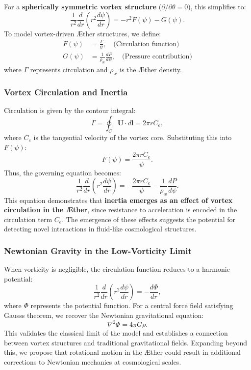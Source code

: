 For a \textbf{spherically symmetric vortex structure} ($\partial/\partial\theta = 0$), this simplifies to:
\begin{equation*}
    \frac{1}{r^2} \frac{d}{dr} \left( r^2 \frac{d\psi}{dr} \right) = - r^2 F(\psi) - G(\psi).
\end{equation*}
To model vortex-driven Æther structures, we define:
\begin{align}
    F(\psi) &= \frac{\Gamma}{\psi}, \quad \text{(Circulation function)} \\
    G(\psi) &= \frac{1}{\rho_\text{\ae}} \frac{dP}{d\psi}, \quad \text{(Pressure contribution)}
\end{align}
where $\Gamma$ represents circulation and $\rho_\text{\ae}$ is the Æther density.

\subsubsection*{Vortex Circulation and Inertia}
Circulation is given by the contour integral:
\begin{equation*}
    \Gamma = \oint_C \mathbf{U} \cdot d\mathbf{l} = 2 \pi r C_e,
\end{equation*}
where $C_e$ is the tangential velocity of the vortex core. Substituting this into $F(\psi)$:
\begin{equation*}
    F(\psi) = \frac{2 \pi r C_e}{\psi}.
\end{equation*}
Thus, the governing equation becomes:
\begin{equation*}
    \frac{1}{r^2} \frac{d}{dr} \left( r^2 \frac{d\psi}{dr} \right) = - \frac{2 \pi r C_e}{\psi} - \frac{1}{\rho_\text{\ae}} \frac{dP}{d\psi}.
\end{equation*}
This equation demonstrates that \textbf{inertia emerges as an effect of vortex circulation in the Æther}, since resistance to acceleration is encoded in the circulation term $C_e$. The emergence of these effects suggests the potential for detecting novel interactions in fluid-like cosmological structures.

\subsubsection*{Newtonian Gravity in the Low-Vorticity Limit}
When vorticity is negligible, the circulation function reduces to a harmonic potential:
\begin{equation*}
    \frac{1}{r^2} \frac{d}{dr} \left( r^2 \frac{d\psi}{dr} \right) = - \frac{d\Phi}{dr},
\end{equation*}
where $\Phi$ represents the potential function. For a central force field satisfying Gauss\rqs s theorem, we recover the Newtonian gravitational equation:
\begin{equation*}
    \nabla^2 \Phi = 4 \pi G \rho.
\end{equation*}
This validates the classical limit of the model and establishes a connection between vortex structures and traditional gravitational fields. Expanding beyond this, we propose that rotational motion in the Æther could result in additional corrections to Newtonian mechanics at cosmological scales.

